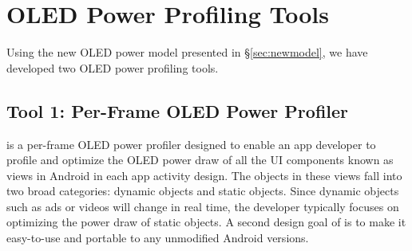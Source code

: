 \section{OLED Power Profiling Tools}
\label{sec:tools}

Using the new OLED power model presented in \S\ref{sec:newmodel}, we
have developed two OLED power profiling tools.

\subsection{Tool 1: Per-Frame OLED Power Profiler}
\label{subsec:analyzer}


\name is a per-frame OLED power profiler designed to enable
an app developer to profile and optimize the OLED power draw of all the
UI components known as views in Android in each app activity design.
The objects in these views fall into two broad categories:
dynamic objects and static objects. Since dynamic objects such as ads or videos
will change in real time, the developer typically focuses on
optimizing the power draw of static objects.
A second design goal of \name is to make it easy-to-use and portable
to any unmodified Android versions.





